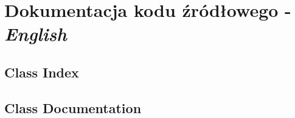\documentclass[11pt,oneside]{book}
\newcommand{\+}{\discretionary{\mbox{\scriptsize$\hookleftarrow$}}{}{}}
\begin{document}
\part{Dokumentacja kodu źródłowego - \textit{English}}
\chapter{Class Index}

\chapter{Class Documentation}


















\end{document}
